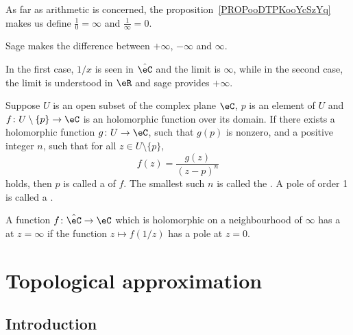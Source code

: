 As far as arithmetic is concerned, the proposition~\ref{PROPooDTPKooYcSzYq} makes us  define \( \frac{1}{ 0 }=\infty\) and \( \frac{ 1 }{ \infty }=0\).

\begin{remark}
	
	Sage makes the difference between \( +\infty\), \( -\infty\) and \( \infty\).

	In the first case, \( 1/x\) is seen in \( \hat \eC\) and the limit is \( \infty\), while in the second case, the limit is understood in \( \eR\) and sage provides \( +\infty\).
\end{remark}

\begin{definition}       \label{DEFooPXYYooOMZYOT}
	Suppose \( U\) is an open subset of the complex plane \( \eC\), $p$ is an element of $U$ and \( f\colon U\setminus\{ p \}\to \eC\) is an holomorphic function  over its domain. If there exists a holomorphic function \( g\colon U\to \eC\), such that $g(p)$ is nonzero, and a positive integer $n$, such that for all \( z\in U\setminus\{ p \}\),
	\begin{equation}
		f(z)=\frac{ g(z) }{ (z-p)^n }
	\end{equation}
	holds, then $p$ is called a  of \( f\). The smallest such $n$ is called the . A pole of order 1 is called a .

	A function \( f\colon \hat \eC\to \eC\) which is holomorphic on a neighbourhood of \( \infty\) has a  at \( z=\infty\) if the function \( z\mapsto f(1/z)\) has a pole at \( z=0\).
\end{definition}

\section{Topological approximation}
\subsection{Introduction}

